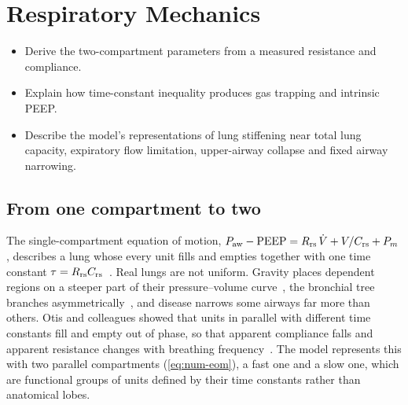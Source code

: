 \chapter{Respiratory Mechanics}
\label{ch:ch06}

\begin{objectives}
\begin{itemize}[leftmargin=*]
  \item Derive the two-compartment parameters from a measured resistance and compliance.
  \item Explain how time-constant inequality produces gas trapping and intrinsic PEEP.
  \item Describe the model's representations of lung stiffening near total lung capacity, expiratory flow limitation, upper-airway collapse and fixed airway narrowing.
\end{itemize}
\end{objectives}

\section{From one compartment to two}
\label{sec:mech-two}
The single-compartment equation of motion, $P_{\mathrm{aw}} - \mathrm{PEEP} = R_{\mathrm{rs}}\,\dot{V} + V/C_{\mathrm{rs}} + P_m$, describes a lung whose every unit fills and empties together with one time constant $\tau = R_{\mathrm{rs}}C_{\mathrm{rs}}$~\citep{bates2009}. Real lungs are not uniform. Gravity places dependent regions on a steeper part of their pressure--volume curve~\citep{milicemili1966}, the bronchial tree branches asymmetrically~\citep{horsfield1968}, and disease narrows some airways far more than others. Otis and colleagues showed that units in parallel with different time constants fill and empty out of phase, so that apparent compliance falls and apparent resistance changes with breathing frequency~\citep{otis1956}. The model represents this with two parallel compartments (\cref{eq:num-eom}), a fast one and a slow one, which are functional groups of units defined by their time constants rather than anatomical lobes.


